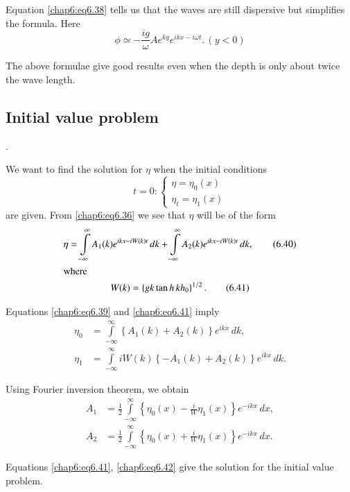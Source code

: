 Equation \eqref{chap6:eq6.38} tells us that the waves are still dispersive but simplifies the formula. Here
$$
\phi\simeq -\frac{ig}{\omega}Ae^{ky}e^{ikx-i\omega t}.\,(y<0)
$$

The above formulae give good results even when the depth is only about twice the wave length.

\subsection*{\bf Initial value problem}.

We want to find the solution for $\eta$ when the initial conditions
\begin{equation}
t=0:
\begin{cases}
\eta =\eta_0(x)\\
\eta_t=\eta_1(x)
\end{cases}\tag{6.39}\label{chap6:eq6.39}
\end{equation}\pageoriginale
are given. From \eqref{chap6:eq6.36} we see that $\eta$ will be of the form 
\begin{gather}
\eta=\int\limits_{-\infty}^\infty A_1(k)e^{ikx-iW(k)t}\,dk+\int\limits_{-\infty}^\infty A_2(k) e^{ikx-iW(k)t}\,dk, \tag{6.40}\label{chap6:eq6.40}\\
\intertext{where}
W(k)=\left\{gk\tan h\,kh_0\right\}^{1/2}.\tag{6.41}\label{chap6:eq6.41}
\end{gather}

Equations \eqref{chap6:eq6.39} and \eqref{chap6:eq6.41} imply
\begin{align*}
\eta_0 &= \int\limits_{-\infty}^\infty \left\{A_1(k)+A_2(k)\right\}e^{ikx}\,dk,\\
\eta_1&= \int\limits_{-\infty}^\infty iW(k)\left\{-A_1(k)+A_2(k)\right\} e^{ikx}\,dk.
\end{align*}

Using Fourier inversion theorem, we obtain
\begin{equation}
\begin{aligned}
A_1 &=\frac{1}{2}\int\limits_{-\infty}^\infty \left\{\eta_0(x)-\frac{i}{W}\eta_1 (x)\right\}e^{-ikx}\,dx,\\
A_2 &= \frac{1}{2}\int\limits_{-\infty}^\infty \left\{\eta_0(x)+\frac{i}{W} \eta_1 (x)\right\}e^{-ikx}\,dx.
\end{aligned}\tag{6.42}\label{chap6:eq6.42}
\end{equation}

Equations \eqref{chap6:eq6.41}, \eqref{chap6:eq6.42} give the solution for the initial value problem.


